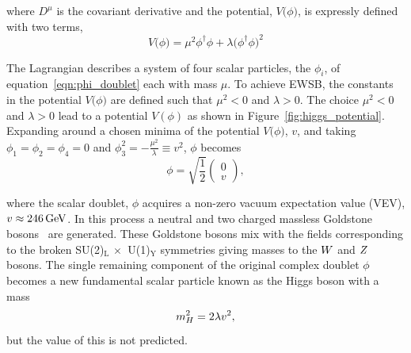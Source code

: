 where $D^{\mu}$ is the covariant derivative and the potential, $V\big(\phi\big)$, 
is expressly defined with two terms, 
\begin{equation}
V\big(\phi\big) = \mu^{2}\phi^{\dagger}\phi + \lambda\big(\phi^{\dagger}\phi\big)^{2}
\label{eqn:v_pot}
\end{equation}

The Lagrangian describes a system of four scalar particles, the $\phi_{i}$,
of equation~\ref{eqn:phi_doublet} each with mass $\mu$. 
To achieve EWSB, the constants in the potential $V\big(\phi\big)$ are defined such that $\mu^{2} < 0$
and $\lambda > 0$. The choice $\mu^{2} < 0$ and $\lambda > 0$ lead to a potential $V\left(\phi\right)$
as shown in Figure~\ref{fig:higgs_potential}. Expanding around a chosen minima of the potential
$V\big(\phi\big)$, $v$, and taking $\phi_{1} = \phi_{2} = \phi_{4} = 0$ and
$\phi_{3}^{2} = -\frac{\mu^{2}}{\lambda} \equiv v^{2}$, $\phi$ becomes
\begin{equation}
\phi = \sqrt{\frac{1}{2}} \begin{pmatrix} 0 \\ v \end{pmatrix},
\label{eqn:phi_doublet_exp}
\end{equation}

where the scalar doublet, $\phi$ acquires a non-zero vacuum expectation value (VEV), $v \approx 246\,\mathrm{GeV}$.
In this process a neutral and two charged massless Goldstone bosons~\cite{PhysRev.127.965} are generated. These Goldstone
bosons mix with the fields corresponding to the broken SU(2)$_{\text{L}} \,\times\,$ U(1)$_{\text{Y}}$
symmetries giving masses to the $W$ and $Z$ bosons. The single remaining component of the
original complex doublet $\phi$ becomes a new fundamental scalar particle 
known as the Higgs boson with a mass
\begin{equation}
m_{H}^{2} = 2\lambda v^2,
\end{equation}
but the value of this is not predicted.


